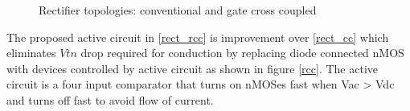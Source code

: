 \documentclass[12pt,a4paper,UKenglish]{report}
\begin{document}
\begin{figure} [htbp]
  \centering 
\hfill
 \caption{Rectifier topologies: conventional and gate cross coupled} 
\label{rect_conv_cc} 
\end{figure}

The proposed active circuit in \ref{rect_rcc} is improvement over \ref{rect_cc} which eliminates $Vtn$ drop required for conduction by replacing diode connected nMOS with devices controlled by active circuit as shown in figure \ref{rcc}. The active circuit is a four input comparator that turns on nMOSes fast when Vac > Vdc and turns off fast to avoid flow of current. \\
\end{document}
